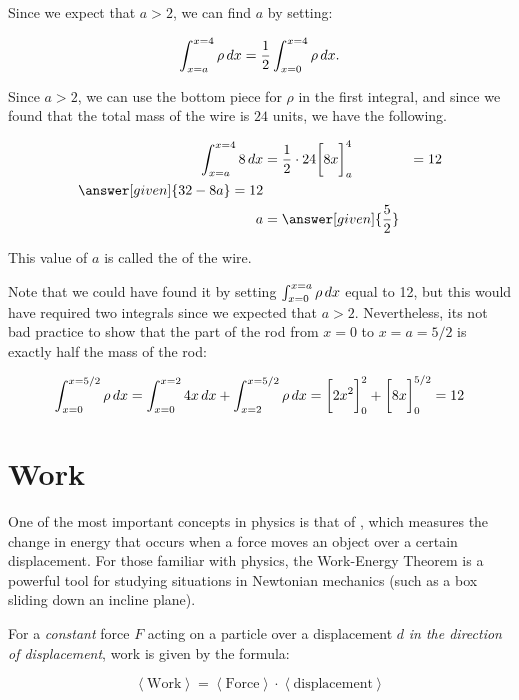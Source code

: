 \documentclass{ximera}
\begin{document}
\begin{example}
\begin{explanation}
 Since we expect that $a>2$, we can find $a$ by setting:
 
 \[
 \int_{x=a}^{x=4} \rho \mathop{}\!d x = \frac{1}{2} \int_{x=0}^{x=4} \rho \mathop{}\!d x. \\
 \]
 
 Since $a>2$, we can use the bottom piece for $\rho$ in the first integral, and since we found that the total mass of the wire is $24$ units, we have the following.
 
 
 \begin{align*}
  \int_{x=a}^{x=4} 8 \d x &= \frac{1}{2} \cdot 24
  \eval{8x}_a^4 &=12 \\
  \answer[given]{32-8a} = 12 \\
  a &= \answer[given]{\frac{5}{2}}
  \end{align*}
  
  \begin{remark}
  This value of $a$ is called the  of the wire.  
  
Note that we could have found it by setting $\int_{x=0}^{x=a} \rho \mathop{}\!d x$ equal to 12, but this would have required two integrals since we expected that $a>2$.  Nevertheless, its not bad practice to show that the part of the rod from $x=0$ to $x=a=5/2$ is exactly half the mass of the rod:
  
  \[
  \int_{x=0}^{x=5/2} \rho \mathop{}\!d x =   \int_{x=0}^{x=2} 4x \mathop{}\!d x +  \int_{x=2}^{x=5/2} \rho \mathop{}\!d x =\bigg[ 2x^2 \bigg]_0^2+\bigg[ 8x \bigg]_0^{5/2} = 12
  \]

  \end{remark}
   \end{explanation}

\end{example}


\section{Work}
One of the most important concepts in physics is that of , which measures the change in energy that occurs when a force moves an object over a certain displacement.  For those familiar with physics, the Work-Energy Theorem is a powerful tool for studying situations in Newtonian mechanics (such as a box sliding down an incline plane). 

For a \emph{constant} force $F$ acting on a particle over a displacement $d$ \emph{in the direction of displacement}, work is given by the formula:

\[ \left<\textrm{Work} \right>=  \left<\textrm{Force} \right> \cdot \left<\textrm{displacement} \right> \]
\end{document}
